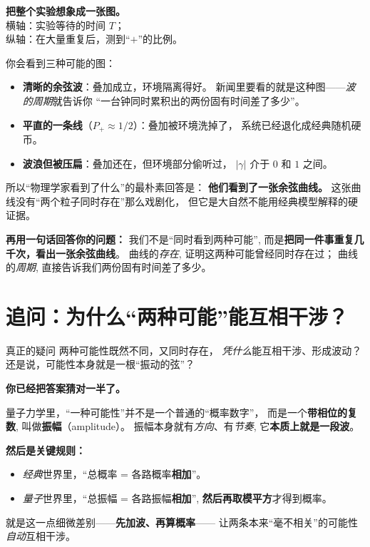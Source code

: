 \documentclass[11pt,a4paper]{ctexart}
\begin{document}
\begin{lifeblock}
\textbf{把整个实验想象成一张图。}\\
横轴：实验等待的时间 $T$；\\
纵轴：在大量重复后，测到``$+$''的比例。

\smallskip
你会看到三种可能的图：
\begin{itemize}
  \item \textbf{清晰的余弦波}：叠加成立，环境隔离得好。
        新闻里要看的就是这种图——\emph{波的周期}就告诉你
        ``一台钟同时累积出的两份固有时间差了多少''。
  \item \textbf{平直的一条线}（$P_{+}\approx 1/2$）：叠加被环境洗掉了，
        系统已经退化成经典随机硬币。
  \item \textbf{波浪但被压扁}：叠加还在，但环境部分偷听过，
        $|\gamma|$ 介于 $0$ 和 $1$ 之间。
\end{itemize}

\smallskip
所以``物理学家看到了什么''的最朴素回答是：
\textbf{他们看到了一张余弦曲线。}
这张曲线没有``两个粒子同时存在''那么戏剧化，
但它是大自然不能用经典模型解释的硬证据。
\end{lifeblock}

\begin{keypointblock}
\textbf{再用一句话回答你的问题：}
我们不是``同时看到两种可能'',
而是\textbf{把同一件事重复几千次，看出一张余弦曲线}。
曲线的\emph{存在}, 证明这两种可能曾经同时存在过；
曲线的\emph{周期}, 直接告诉我们两份固有时间差了多少。
\end{keypointblock}

\section{追问：为什么``两种可能''能互相干涉？}

\begin{questionblock}{真正的疑问}
两种可能性既然不同，又同时存在，
\emph{凭什么}能互相干涉、形成波动？
还是说，可能性本身就是一根``振动的弦''？
\end{questionblock}

\begin{answerblock}
\textbf{你已经把答案猜对一半了。}

\smallskip
量子力学里，``一种可能性''并不是一个普通的``概率数字''，
而是一个\textbf{带相位的复数}, 叫做\textbf{振幅}（amplitude）。
振幅本身就有\emph{方向}、有\emph{节奏}, 它\textbf{本质上就是一段波}。

\smallskip
\textbf{然后是关键规则：}
\begin{itemize}
  \item \emph{经典}世界里，``总概率 = 各路概率\textbf{相加}''。
  \item \emph{量子}世界里，``总振幅 = 各路振幅\textbf{相加}'',
        \textbf{然后再取模平方}才得到概率。
\end{itemize}
就是这一点细微差别——\textbf{先加波、再算概率}——
让两条本来``毫不相关''的可能性\emph{自动}互相干涉。
\end{answerblock}
\end{document}
